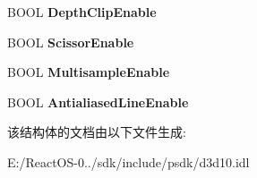 \begin{DoxyCompactItemize}
B\+O\+OL {\bfseries Depth\+Clip\+Enable}
\item 
\mbox{\label{struct_d3_d10___r_a_s_t_e_r_i_z_e_r___d_e_s_c_abc07472bafda861de18c565ad19eb86c}} 
B\+O\+OL {\bfseries Scissor\+Enable}
\item 
\mbox{\label{struct_d3_d10___r_a_s_t_e_r_i_z_e_r___d_e_s_c_ad66683711bebc51cbf14db30ae3508bd}} 
B\+O\+OL {\bfseries Multisample\+Enable}
\item 
\mbox{\label{struct_d3_d10___r_a_s_t_e_r_i_z_e_r___d_e_s_c_a71db8209a8c6570b79ab26b89eac954a}} 
B\+O\+OL {\bfseries Antialiased\+Line\+Enable}
\end{DoxyCompactItemize}


该结构体的文档由以下文件生成\+:\begin{DoxyCompactItemize}
\item 
E\+:/\+React\+O\+S-\/0../sdk/include/psdk/d3d10.\+idl\end{DoxyCompactItemize}

